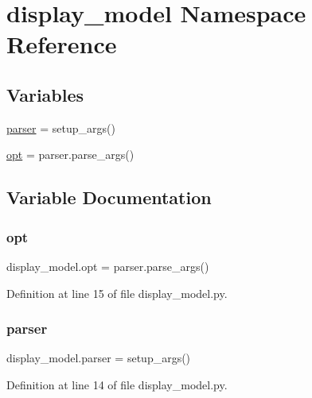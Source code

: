 \hypertarget{namespacedisplay__model}{}\section{display\+\_\+model Namespace Reference}
\label{namespacedisplay__model}
\subsection*{Variables}
\begin{DoxyCompactItemize}
\item 
\hyperlink{namespacedisplay__model_a8d98f27193cc6a84c7f59bb9822d926b}{parser} = setup\+\_\+args()
\item 
\hyperlink{namespacedisplay__model_a6c64a2bc5d01c7047d71dcdeacd12581}{opt} = parser.\+parse\+\_\+args()
\end{DoxyCompactItemize}


\subsection{Variable Documentation}
\mbox{\label{namespacedisplay__model_a6c64a2bc5d01c7047d71dcdeacd12581}} 
\subsubsection{\texorpdfstring{opt}{opt}}
{\footnotesize\ttfamily display\+\_\+model.\+opt = parser.\+parse\+\_\+args()}



Definition at line 15 of file display\+\_\+model.\+py.

\mbox{\label{namespacedisplay__model_a8d98f27193cc6a84c7f59bb9822d926b}} 
\subsubsection{\texorpdfstring{parser}{parser}}
{\footnotesize\ttfamily display\+\_\+model.\+parser = setup\+\_\+args()}



Definition at line 14 of file display\+\_\+model.\+py.

